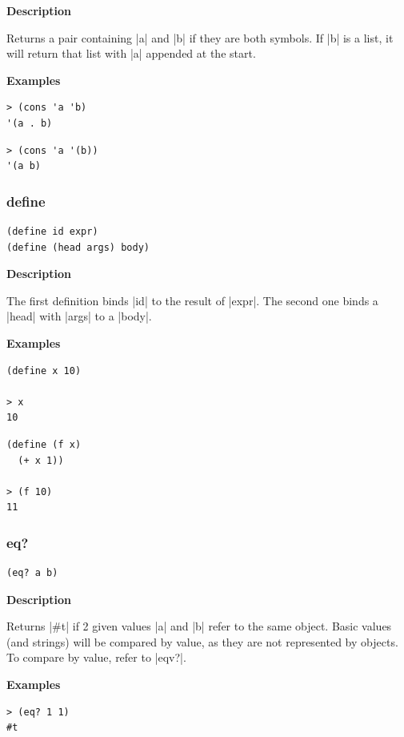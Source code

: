 \documentclass[a4paper]{article}
\begin{document}
\textbf{Description}

Returns a pair containing |a| and |b| if they are both symbols. If |b| is a list, it will return that list with |a| appended at the start.

\textbf{Examples}

\begin{lstlisting}
> (cons 'a 'b)
'(a . b)
\end{lstlisting}

\begin{lstlisting}
> (cons 'a '(b))
'(a b)
\end{lstlisting}

\subsubsection{define}

\begin{lstlisting}[frame=none]
(define id expr)
(define (head args) body)
\end{lstlisting}

\textbf{Description}

The first definition binds |id| to the result of |expr|. The second one binds a |head| with |args| to a |body|.

\textbf{Examples}

\begin{lstlisting}
(define x 10)

> x
10
\end{lstlisting}

\begin{lstlisting}
(define (f x)
  (+ x 1))
  
> (f 10)
11
\end{lstlisting}


\subsubsection{eq?}

\begin{lstlisting}[frame=none]
(eq? a b)
\end{lstlisting}

\textbf{Description}

Returns |#t| if 2 given values |a| and |b| refer to the same object. Basic values (and strings) will be compared by value, as they are not represented by objects. To compare by value, refer to |eqv?|.

\textbf{Examples}

\begin{lstlisting}
> (eq? 1 1)
#t
\end{lstlisting}
\end{document}
